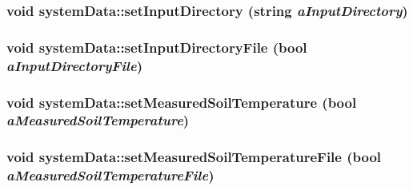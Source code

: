 \hypertarget{classsystem_data_a8bdf9ac53eb541c563b2e6af18d1d645}{
\subsubsection[{setInputDirectory}]{\setlength{\rightskip}{0pt plus 5cm}void systemData::setInputDirectory (string {\em aInputDirectory})}}
\label{classsystem_data_a8bdf9ac53eb541c563b2e6af18d1d645}
\hypertarget{classsystem_data_a83a4da7886d2efd14ca3413c1870a8ef}{
\subsubsection[{setInputDirectoryFile}]{\setlength{\rightskip}{0pt plus 5cm}void systemData::setInputDirectoryFile (bool {\em aInputDirectoryFile})}}
\label{classsystem_data_a83a4da7886d2efd14ca3413c1870a8ef}
\hypertarget{classsystem_data_a50e8ba1807a6cfffff6e7fbc957aca37}{
\subsubsection[{setMeasuredSoilTemperature}]{\setlength{\rightskip}{0pt plus 5cm}void systemData::setMeasuredSoilTemperature (bool {\em aMeasuredSoilTemperature})}}
\label{classsystem_data_a50e8ba1807a6cfffff6e7fbc957aca37}
\hypertarget{classsystem_data_a8c57f6c008c35fce32e9bd5acde8bb17}{
\subsubsection[{setMeasuredSoilTemperatureFile}]{\setlength{\rightskip}{0pt plus 5cm}void systemData::setMeasuredSoilTemperatureFile (bool {\em aMeasuredSoilTemperatureFile})}}
